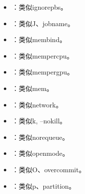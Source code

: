 \documentclass[a4paper,12pt,english]{sphinxmanual}
\begin{document}
\begin{itemize}
\item {} 
\sphinxAtStartPar
{}：类似\sphinxhyphen{}\sphinxhyphen{}ignore\sphinxhyphen{}pbs。

\item {} 
\sphinxAtStartPar
{}：类似\sphinxhyphen{}J、\sphinxhyphen{}\sphinxhyphen{}job\sphinxhyphen{}name。

\item {} 
\sphinxAtStartPar
{}：类似\sphinxhyphen{}\sphinxhyphen{}mem\sphinxhyphen{}bind。

\item {} 
\sphinxAtStartPar
{}：类似\sphinxhyphen{}\sphinxhyphen{}mem\sphinxhyphen{}per\sphinxhyphen{}cpu。

\item {} 
\sphinxAtStartPar
{}：类似\sphinxhyphen{}\sphinxhyphen{}mem\sphinxhyphen{}per\sphinxhyphen{}gpu。

\item {} 
\sphinxAtStartPar
{}：类似\sphinxhyphen{}\sphinxhyphen{}mem。

\item {} 
\sphinxAtStartPar
{}：类似\sphinxhyphen{}\sphinxhyphen{}network。

\item {} 
\sphinxAtStartPar
{}：类似\sphinxhyphen{}k, –no\sphinxhyphen{}kill。

\item {} 
\sphinxAtStartPar
{}：类似\sphinxhyphen{}\sphinxhyphen{}no\sphinxhyphen{}requeue。

\item {} 
\sphinxAtStartPar
{}：类似\sphinxhyphen{}\sphinxhyphen{}open\sphinxhyphen{}mode。

\item {} 
\sphinxAtStartPar
{}：类似\sphinxhyphen{}O、\sphinxhyphen{}\sphinxhyphen{}overcommit。

\item {} 
\sphinxAtStartPar
{}：类似\sphinxhyphen{}p、\sphinxhyphen{}\sphinxhyphen{}partition。


\end{itemize}
\end{document}
